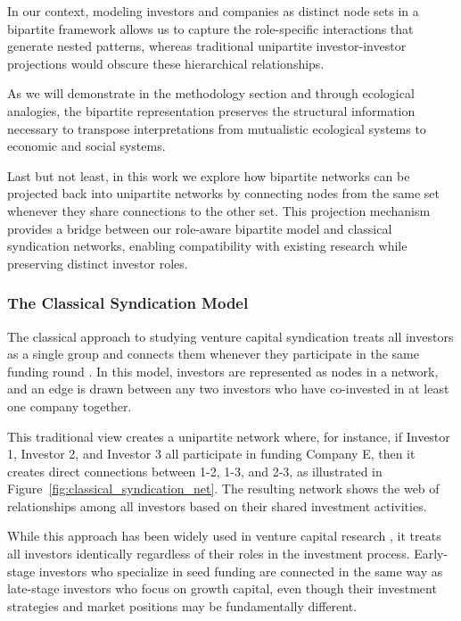 In our context, modeling investors and companies as distinct node sets in a bipartite framework allows us to capture the role-specific interactions that generate nested patterns, whereas traditional unipartite investor-investor projections \cite{Bygrave1987} would obscure these hierarchical relationships. 

As we will demonstrate in the methodology section and through ecological analogies, the bipartite representation preserves the structural information necessary to transpose interpretations from mutualistic ecological systems to economic and social systems.

Last but not least, in this work we explore how bipartite networks can be projected back into unipartite networks by connecting nodes from the same set whenever they share connections to the other set. This projection mechanism provides a bridge between our role-aware bipartite model and classical syndication networks, enabling compatibility with existing research while preserving distinct investor roles.

\subsubsection{The Classical Syndication Model}

The classical approach to studying venture capital syndication treats all investors as a single group and connects them whenever they participate in the same funding round \cite{Bygrave1987}. In this model, investors are represented as nodes in a network, and an edge is drawn between any two investors who have co-invested in at least one company together.

This traditional view creates a unipartite network where, for instance, if Investor 1, Investor 2, and Investor 3 all participate in funding Company E, then it creates direct connections between 1-2, 1-3, and 2-3, as illustrated in Figure~\ref{fig:classical_syndication_net}. The resulting network shows the web of relationships among all investors based on their shared investment activities.

While this approach has been widely used in venture capital research \cite{Bygrave1987}, it treats all investors identically regardless of their roles in the investment process. Early-stage investors who specialize in seed funding are connected in the same way as late-stage investors who focus on growth capital, even though their investment strategies and market positions may be fundamentally different.

